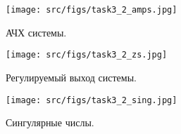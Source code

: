 \begin{figure}[ht!]
    \centering
    \texttt{[image: src/figs/task3\_2\_amps.jpg]}
    \caption{АЧХ системы.}
    \label{fig:task3_2_amps}
  \end{figure}
  
  \begin{figure}[ht!]
    \centering
    \texttt{[image: src/figs/task3\_2\_zs.jpg]}
    \caption{Регулируемый выход системы.}
    \label{fig:task3_2_zs}
  \end{figure}
  
  \begin{figure}[ht!]
    \centering
    \texttt{[image: src/figs/task3\_2\_sing.jpg]}
    \caption{Сингулярные числы.}
    \label{fig:task3_2_sing}
  \end{figure}

\FloatBarrier